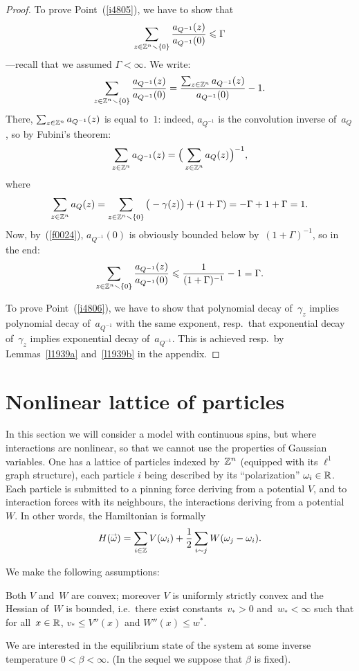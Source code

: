 \begin{proof}
To prove Point~(\ref{i4805}), we have to show that
\[ \sum_{z\in\mathbb{Z}^n\smallsetminus\{0\}} \frac{a_{Q^{-1}}(z)}{a_{Q^{-1}}(0)} \leqslant \Gamma \]
—recall that we assumed $\Gamma < \infty$.
We write:
\[\label{f1610} \sum_{z\in\mathbb{Z}^n\smallsetminus\{0\}} \frac{a_{Q^{-1}}(z)}{a_{Q^{-1}}(0)}
= \frac{\sum_{z\in\mathbb{Z}^n}a_{Q^{-1}}(z)}{a_{Q^{-1}}(0)} - 1 .\]
%
There, $\sum_{z\in\mathbb{Z}^n}a_{Q^{-1}}(z)$ is equal to~$1$:
indeed, $a_{Q^{-1}}$ is the convolution inverse of~$a_Q$,
so by Fubini's theorem:
\[ \sum_{z\in\ZZ^n} a_{Q^{-1}}(z) = \Big( \sum_{z\in\ZZ^n} a_Q(z) \Big)^{-1} ,\]
where
\[ \sum_{z\in\ZZ^n} a_Q(z) = \sum_{z\in\ZZ^n\setminus\{0\}}\big(-\gamma(z)\big) + (1+\Gamma)
= -\Gamma + 1 + \Gamma = 1 .\]
Now, by~(\ref{f0024}),
$a_{Q^{-1}}(0)$ is obviously bounded below by~$(1+\Gamma)^{-1}$, so in the end:
\[ \sum_{z\in\mathbb{Z}^n\smallsetminus\{0\}} \frac{a_{Q^{-1}}(z)}{a_{Q^{-1}}(0)}
\leqslant \frac{1}{(1+\Gamma)^{-1}} - 1 = \Gamma .\]

To prove Point~(\ref{i4806}), we have to show that
polynomial decay of~$\gamma_z$ implies polynomial decay of~$a_{Q^{-1}}$
with the same exponent, resp.\ that exponential decay of~$\gamma_z$
implies exponential decay of~$a_{Q^{-1}}$.
This is achieved resp.\ by Lemmas~\ref{l1939a} and~\ref{l1939b} in the appendix.
\end{proof}



\section{Nonlinear lattice of particles}\label{parNonlinearLatticeOfParticles}

In this section we will consider a model with continuous spins,
but where interactions are nonlinear, so that we cannot use the properties of Gaussian variables.
One has a lattice of particles indexed by~$\mathbb{Z}^n$ (equipped with its $\ell^1$ graph structure),
each particle $i$ being described by its ``polarization'' $\omega_i\in\mathbb{R}$.
Each particle is submitted to a pinning force deriving from a potential $V$,
and to interaction forces with its neighbours, the interactions deriving from a potential $W$.
In other words, the Hamiltonian is formally
\[\label{forHNL} H(\vec\omega) = \sum_{i\in\ZZ} V(\omega_i) +
\frac{1}{2} \sum_{i\sim j} W(\omega_j-\omega_i) .\]

We make the following assumptions:
\begin{Hyp}\label{hypVW}
Both $V$ and~$W$ are convex; moreover
$V$ is uniformly strictly convex and the Hessian of~$W$ is bounded,
i.e.\ there exist constants~$v_*>0$ and~$w_*<\infty$
such that for all~$x \in \mathbb{R}$, $v_* \leq V''(x)$ and $W''(x) \leq w^*$.
\end{Hyp}
%
We are interested in the equilibrium state of the system at some inverse temperature
$0 < \beta < \infty$. (In the sequel we suppose that $\beta$ is fixed).

